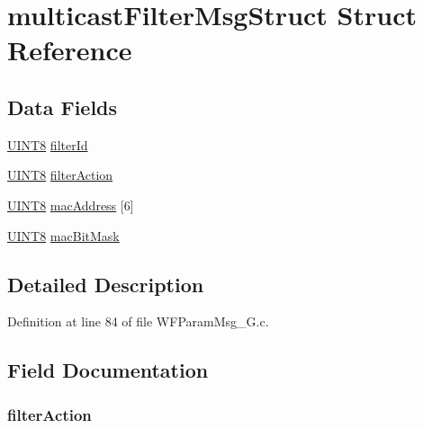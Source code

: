\hypertarget{structmulticast_filter_msg_struct}{}\section{multicast\+Filter\+Msg\+Struct Struct Reference}
\label{structmulticast_filter_msg_struct}
\subsection*{Data Fields}
\begin{DoxyCompactItemize}
\item 
\hyperlink{_generic_type_defs_8h_ab27e9918b538ce9d8ca692479b375b6a}{U\+I\+N\+T8} \hyperlink{structmulticast_filter_msg_struct_af4dfe7a73d68de57144857ed208b4ee1}{filter\+Id}
\item 
\hyperlink{_generic_type_defs_8h_ab27e9918b538ce9d8ca692479b375b6a}{U\+I\+N\+T8} \hyperlink{structmulticast_filter_msg_struct_a076f8b8aa34a6f371d7deadfe394d869}{filter\+Action}
\item 
\hyperlink{_generic_type_defs_8h_ab27e9918b538ce9d8ca692479b375b6a}{U\+I\+N\+T8} \hyperlink{structmulticast_filter_msg_struct_a4b55693b22e933a6f6a10bc22b3c96fb}{mac\+Address} \mbox{[}6\mbox{]}
\item 
\hyperlink{_generic_type_defs_8h_ab27e9918b538ce9d8ca692479b375b6a}{U\+I\+N\+T8} \hyperlink{structmulticast_filter_msg_struct_aa38c85c998eb2ae76de051679393007c}{mac\+Bit\+Mask}
\end{DoxyCompactItemize}


\subsection{Detailed Description}


Definition at line 84 of file W\+F\+Param\+Msg\+\_\+G.\+c.



\subsection{Field Documentation}
\hypertarget{structmulticast_filter_msg_struct_a076f8b8aa34a6f371d7deadfe394d869}{}
\subsubsection[{filter\+Action}]{ filter\+Action}\label{structmulticast_filter_msg_struct_a076f8b8aa34a6f371d7deadfe394d869}


